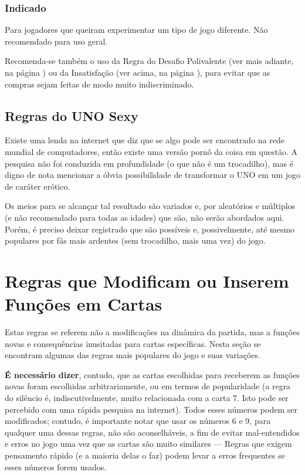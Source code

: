 \subsubsection{Indicado} 

Para jogadores que queiram experimentar um tipo de jogo diferente. Não recomendado para uso geral.

Recomenda-se também o uso da Regra do Desafio Polivalente (ver mais adiante, na página \pageref{desafiopolivalente}) ou da Insatisfação (ver acima, na página \pageref{insatisfacao}), para evitar que as compras sejam feitas de modo muito indiscriminado.

\subsection{Regras do UNO Sexy}

Existe uma lenda na internet que diz que se algo pode ser encontrado na rede mundial de computadores, então existe uma versão pornô da coisa em questão. A pesquisa não foi conduzida em profundidade (o que não é um trocadilho), mas é digno de nota mencionar a óbvia possibilidade de transformar o UNO em um jogo de caráter erótico.

Os meios para se alcançar tal resultado são variados e, por aleatórios e múltiplos (e não recomendado para todas as idades) que são, não serão abordados aqui. Porém, é preciso deixar registrado que são possíveis e, possivelmente, até mesmo populares por fãs mais ardentes (sem trocadilho, mais uma vez) do jogo.

\section{Regras que Modificam ou Inserem Funções em Cartas}

Estas regras se referem não a modificações na dinâmica da partida, mas a funções novas e consequências inusitadas para cartas específicas. Nesta seção se encontram algumas das regras mais populares do jogo e suas variações.

\textbf{É necessário dizer}, contudo, que as cartas escolhidas para receberem as funções novas foram escolhidas arbitrariamente, ou em termos de popularidade (a regra do silêncio é, indiscutivelmente, muito relacionada com a carta 7. Isto pode ser percebido com uma rápida pesquisa na internet). Todos esses números podem ser modificados; contudo, é importante notar que usar os números 6 e 9, para qualquer uma dessas regras, não são aconselháveis, a fim de evitar mal-entendidos e erros no jogo uma vez que as cartas são muito similares --- Regras que exigem pensamento rápido (e a maioria delas o faz) podem levar a erros frequentes se esses números forem usados. 

